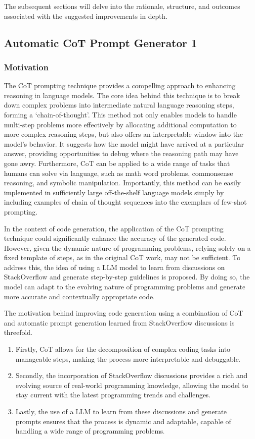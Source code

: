 \documentclass[a4paper,oneside]{book}
\begin{document}
The subsequent sections will delve into the rationale, structure, and outcomes associated with the suggested improvements in depth.

\subsection{Automatic CoT Prompt Generator 1}
\subsubsection{Motivation}
The CoT prompting technique provides a compelling approach to enhancing reasoning in language models. The core idea behind this technique is to break down complex problems into intermediate natural language reasoning steps, forming a `chain-of-thought'. This method not only enables models to handle multi-step problems more effectively by allocating additional computation to more complex reasoning steps, but also offers an interpretable window into the model's behavior. It suggests how the model might have arrived at a particular answer, providing opportunities to debug where the reasoning path may have gone awry. Furthermore, CoT can be applied to a wide range of tasks that humans can solve via language, such as math word problems, commonsense reasoning, and symbolic manipulation. Importantly, this method can be easily implemented in sufficiently large off-the-shelf language models simply by including examples of chain of thought sequences into the exemplars of few-shot prompting.

In the context of code generation, the application of the CoT prompting technique could significantly enhance the accuracy of the generated code. However, given the dynamic nature of programming problems, relying solely on a fixed template of steps, as in the original CoT work, may not be sufficient. To address this, the idea of using a LLM model to learn from discussions on StackOverflow and generate step-by-step guidelines is proposed. By doing so, the model can adapt to the evolving nature of programming problems and generate more accurate and contextually appropriate code.

The motivation behind improving code generation using a combination of CoT and automatic prompt generation learned from StackOverflow discussions is threefold.

\begin{enumerate}
    \item Firstly, CoT allows for the decomposition of complex coding tasks into manageable steps, making the process more interpretable and debuggable.
    \item Secondly, the incorporation of StackOverflow discussions provides a rich and evolving source of real-world programming knowledge, allowing the model to stay current with the latest programming trends and challenges.
    \item Lastly, the use of a LLM to learn from these discussions and generate prompts ensures that the process is dynamic and adaptable, capable of handling a wide range of programming problems.
\end{enumerate}
\end{document}
